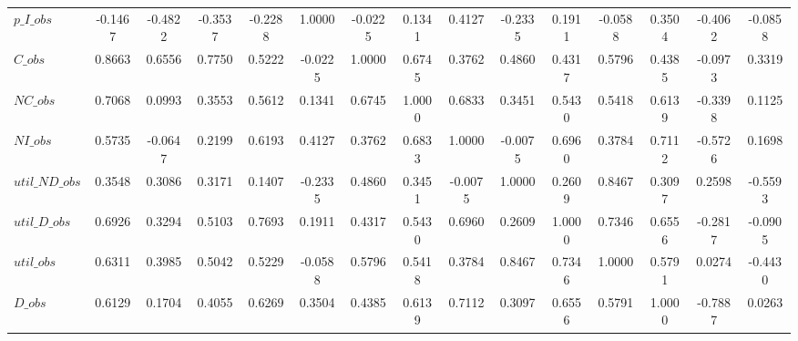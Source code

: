 \begin{center}
\begin{longtable}{lcccccccccccccc}
$p\_I\_obs      $	 & 	          -0.1467	 & 	          -0.4822	 & 	          -0.3537	 & 	          -0.2288	 & 	           1.0000	 & 	          -0.0225	 & 	           0.1341	 & 	           0.4127	 & 	          -0.2335	 & 	           0.1911	 & 	          -0.0588	 & 	           0.3504	 & 	          -0.4062	 & 	          -0.0858 \\ 
$C\_obs         $	 & 	           0.8663	 & 	           0.6556	 & 	           0.7750	 & 	           0.5222	 & 	          -0.0225	 & 	           1.0000	 & 	           0.6745	 & 	           0.3762	 & 	           0.4860	 & 	           0.4317	 & 	           0.5796	 & 	           0.4385	 & 	          -0.0973	 & 	           0.3319 \\ 
$NC\_obs        $	 & 	           0.7068	 & 	           0.0993	 & 	           0.3553	 & 	           0.5612	 & 	           0.1341	 & 	           0.6745	 & 	           1.0000	 & 	           0.6833	 & 	           0.3451	 & 	           0.5430	 & 	           0.5418	 & 	           0.6139	 & 	          -0.3398	 & 	           0.1125 \\ 
$NI\_obs        $	 & 	           0.5735	 & 	          -0.0647	 & 	           0.2199	 & 	           0.6193	 & 	           0.4127	 & 	           0.3762	 & 	           0.6833	 & 	           1.0000	 & 	          -0.0075	 & 	           0.6960	 & 	           0.3784	 & 	           0.7112	 & 	          -0.5726	 & 	           0.1698 \\ 
$util\_ND\_obs  $	 & 	           0.3548	 & 	           0.3086	 & 	           0.3171	 & 	           0.1407	 & 	          -0.2335	 & 	           0.4860	 & 	           0.3451	 & 	          -0.0075	 & 	           1.0000	 & 	           0.2609	 & 	           0.8467	 & 	           0.3097	 & 	           0.2598	 & 	          -0.5593 \\ 
$util\_D\_obs   $	 & 	           0.6926	 & 	           0.3294	 & 	           0.5103	 & 	           0.7693	 & 	           0.1911	 & 	           0.4317	 & 	           0.5430	 & 	           0.6960	 & 	           0.2609	 & 	           1.0000	 & 	           0.7346	 & 	           0.6556	 & 	          -0.2817	 & 	          -0.0905 \\ 
$util\_obs      $	 & 	           0.6311	 & 	           0.3985	 & 	           0.5042	 & 	           0.5229	 & 	          -0.0588	 & 	           0.5796	 & 	           0.5418	 & 	           0.3784	 & 	           0.8467	 & 	           0.7346	 & 	           1.0000	 & 	           0.5791	 & 	           0.0274	 & 	          -0.4430 \\ 
$D\_obs         $	 & 	           0.6129	 & 	           0.1704	 & 	           0.4055	 & 	           0.6269	 & 	           0.3504	 & 	           0.4385	 & 	           0.6139	 & 	           0.7112	 & 	           0.3097	 & 	           0.6556	 & 	           0.5791	 & 	           1.0000	 & 	          -0.7887	 & 	           0.0263 \\ 

\end{longtable}
\end{center}
